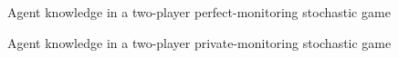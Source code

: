 \begin{figure}[pth]
\centering
{}
\caption{
Agent knowledge in a two-player perfect-monitoring stochastic game
}
\label{fig:agent_knowledge_public_information_stochastic_game}
\end{figure}

\begin{figure}[pth]
\centering
{}
\caption{
Agent knowledge in a two-player private-monitoring stochastic game
}
\label{fig:agent_knowledge_private_information_stochastic_game}
\end{figure}
